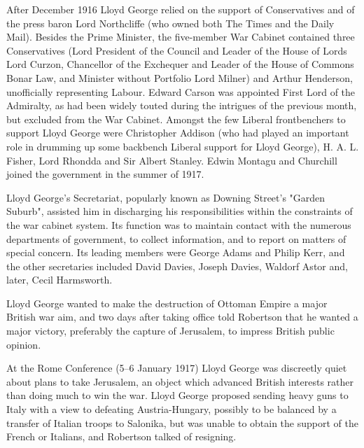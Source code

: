 \documentclass[a4paper,]{book}
\begin{document}
After December 1916 Lloyd George relied on the support of Conservatives and of the press baron Lord Northcliffe (who owned both The Times and the Daily Mail). Besides the Prime Minister, the five-member War Cabinet contained three Conservatives (Lord President of the Council and Leader of the House of Lords Lord Curzon, Chancellor of the Exchequer and Leader of the House of Commons Bonar Law, and Minister without Portfolio Lord Milner) and Arthur Henderson, unofficially representing Labour. Edward Carson was appointed First Lord of the Admiralty, as had been widely touted during the intrigues of the previous month, but excluded from the War Cabinet. Amongst the few Liberal frontbenchers to support Lloyd George were Christopher Addison (who had played an important role in drumming up some backbench Liberal support for Lloyd George), H. A. L. Fisher, Lord Rhondda and Sir Albert Stanley. Edwin Montagu and Churchill joined the government in the summer of 1917.

Lloyd George's Secretariat, popularly known as Downing Street's "Garden Suburb", assisted him in discharging his responsibilities within the constraints of the war cabinet system. Its function was to maintain contact with the numerous departments of government, to collect information, and to report on matters of special concern. Its leading members were George Adams and Philip Kerr, and the other secretaries included David Davies, Joseph Davies, Waldorf Astor and, later, Cecil Harmsworth.

Lloyd George wanted to make the destruction of Ottoman Empire a major British war aim, and two days after taking office told Robertson that he wanted a major victory, preferably the capture of Jerusalem, to impress British public opinion.

At the Rome Conference (5–6 January 1917) Lloyd George was discreetly quiet about plans to take Jerusalem, an object which advanced British interests rather than doing much to win the war. Lloyd George proposed sending heavy guns to Italy with a view to defeating Austria-Hungary, possibly to be balanced by a transfer of Italian troops to Salonika, but was unable to obtain the support of the French or Italians, and Robertson talked of resigning.
\end{document}
